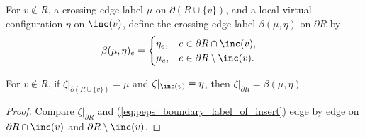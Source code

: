 \begin{definition}%
    \label{def:peps_boundaryLabelOfInsert}
    \leanok
    For $v\notin R$, a crossing-edge label $\mu$ on $\partial(R\cup\{v\})$, and a local virtual configuration $\eta$ on $\inc(v)$, define the crossing-edge label $\beta(\mu,\eta)$ on $\partial R$ by
    \begin{align}
        \beta(\mu,\eta)_e & =
        \begin{cases}
            \eta_e, & e\in\partial R\cap\inc(v),      \\
            \mu_e,  & e\in\partial R\setminus\inc(v).
        \end{cases}
        \label{eq:peps_boundary_label_of_insert}
    \end{align}
\end{definition}

\begin{lemma}%
    \label{thm:peps_regionBoundaryLabel_eq_boundaryLabelOfInsert}
    \leanok
    For $v\notin R$, if $\zeta|_{\partial(R\cup\{v\})}=\mu$ and $\zeta|_{\inc(v)}=\eta$, then $\zeta|_{\partial R}=\beta(\mu,\eta)$.
\end{lemma}
\begin{proof}\leanok
    Compare $\zeta|_{\partial R}$ and (\ref{eq:peps_boundary_label_of_insert}) edge by edge on $\partial R\cap\inc(v)$ and $\partial R\setminus\inc(v)$.
\end{proof}


